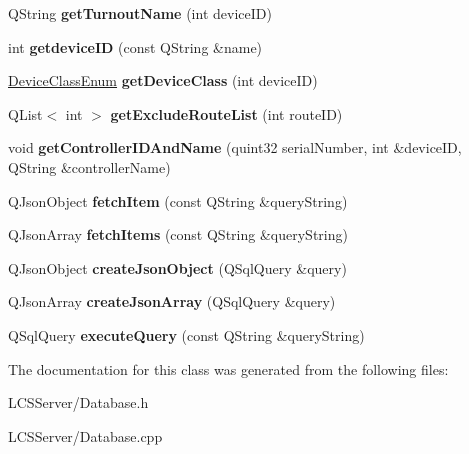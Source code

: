 \begin{DoxyCompactItemize}
Q\+String {\bfseries get\+Turnout\+Name} (int device\+ID)
\item 
\mbox{\label{class_database_aefd61c538939ce9b79c85c2df6914447}} 
int {\bfseries getdevice\+ID} (const Q\+String \&name)
\item 
\mbox{\label{class_database_aaa5f3cfe0c9dc902c3e8d688e8f954d7}} 
\hyperlink{_global_defs_8h_ad17679fac69973be9b3a2787a60d7722}{Device\+Class\+Enum} {\bfseries get\+Device\+Class} (int device\+ID)
\item 
\mbox{\label{class_database_a34aaa93240ff4b005b10e44ba1c6eaba}} 
Q\+List$<$ int $>$ {\bfseries get\+Exclude\+Route\+List} (int route\+ID)
\item 
\mbox{\label{class_database_a52a865e7e0e177dab5c0a451f37a1d1a}} 
void {\bfseries get\+Controller\+I\+D\+And\+Name} (quint32 serial\+Number, int \&device\+ID, Q\+String \&controller\+Name)
\item 
\mbox{\label{class_database_a1d17037c1dfaa2f67327ae0297d4567a}} 
Q\+Json\+Object {\bfseries fetch\+Item} (const Q\+String \&query\+String)
\item 
\mbox{\label{class_database_a1b1bd2990fdc80d0f4ed51f571966272}} 
Q\+Json\+Array {\bfseries fetch\+Items} (const Q\+String \&query\+String)
\item 
\mbox{\label{class_database_a82058cf13df09949bc4f6e28ce4931ba}} 
Q\+Json\+Object {\bfseries create\+Json\+Object} (Q\+Sql\+Query \&query)
\item 
\mbox{\label{class_database_a27d4e89a6c9e7bdd79a4548dcc0bafa7}} 
Q\+Json\+Array {\bfseries create\+Json\+Array} (Q\+Sql\+Query \&query)
\item 
\mbox{\label{class_database_a153d5c808b5da86954ef73b164ece2bf}} 
Q\+Sql\+Query {\bfseries execute\+Query} (const Q\+String \&query\+String)
\end{DoxyCompactItemize}


The documentation for this class was generated from the following files\+:\begin{DoxyCompactItemize}
\item 
L\+C\+S\+Server/Database.\+h\item 
L\+C\+S\+Server/Database.\+cpp\end{DoxyCompactItemize}
